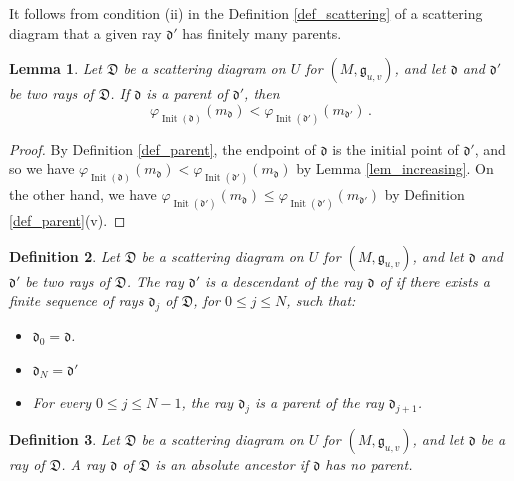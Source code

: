 \documentclass[12pt, a4paper]{amsart}
\newtheorem{defn}{Definition}[section]
\newtheorem{lem}[defn]{Lemma}
\newcommand\fd{\mathfrak d}
\newcommand\fD{\mathfrak D}
\newcommand\fg{\mathfrak g}
\newcommand\Init{\operatorname{Init}}
\begin{document}
It follows from condition (ii) in the Definition 
\ref{def_scattering} of a scattering diagram that a given ray $\fd'$ has finitely many parents.


\begin{lem} \label{lem_desc_phi}
Let $\fD$ be a scattering diagram on 
$U$ for $(M,\fg_{u,v})$, and let $\fd$ and $\fd'$ be two rays of 
$\fD$. If $\fd$ is a parent of $\fd'$, then 
\[ \varphi_{\Init(\fd)}(m_{\fd}) < \varphi_{\Init(\fd')}(m_{\fd'}) \,. \]
\end{lem}

\begin{proof}
By Definition \ref{def_parent}, the endpoint of $\fd$ is the initial point of $\fd'$, and so we have $\varphi_{\Init(\fd)}(m_{\fd})<\varphi_{\Init(\fd')}(m_{\fd})$ by Lemma \ref{lem_increasing}. On the other hand, we have 
$\varphi_{\Init(\fd')}(m_{\fd}) \leqslant \varphi_{\Init(\fd')}(m_{\fd'})$ by Definition \ref{def_parent}(v).
\end{proof}

\begin{defn} \label{def_descendant}
Let $\fD$ be a scattering diagram on 
$U$ for $(M,\fg_{u,v})$, and let $\fd$ and $\fd'$ be two rays of 
$\fD$. The ray $\fd'$ is a \emph{descendant} of the ray 
$\fd$ of if there exists a finite sequence of rays $\fd_j$ of $\fD$, for
$0 \leqslant j \leqslant N$, such that:
\begin{itemize}
\item[(i)] $\fd_0=\fd$.
\item[(ii)] $\fd_N=\fd'$
\item[(iii)] For every $0 \leqslant j \leqslant N-1$, the ray $\fd_j$ is a parent of the ray $\fd_{j+1}$.
\end{itemize}
\end{defn}


\begin{defn}
Let $\fD$ be a scattering diagram on 
$U$ for $(M,\fg_{u,v})$, and let $\fd$ be a ray of 
$\fD$. A ray $\fd$ of 
$\fD$ is an \emph{absolute ancestor} if $\fd$ has no parent.
\end{defn}
\end{document}

